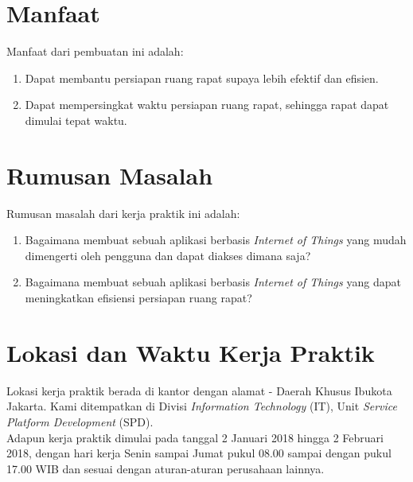 \section{Manfaat}
\tab Manfaat dari pembuatan \sistemSpasi ini adalah:
\begin{enumerate}
	\item Dapat membantu persiapan ruang rapat supaya lebih efektif dan efisien.
	\item Dapat mempersingkat waktu persiapan ruang rapat, sehingga rapat dapat dimulai tepat waktu.
\end{enumerate}

\section{Rumusan Masalah}
\tab Rumusan masalah dari kerja praktik ini adalah:
\begin{enumerate}
	\item Bagaimana membuat sebuah aplikasi berbasis \textit{Internet of Things} yang mudah dimengerti oleh pengguna dan dapat diakses dimana saja?
	\item Bagaimana membuat sebuah aplikasi berbasis \textit{Internet of Things} yang dapat meningkatkan efisiensi persiapan ruang rapat?
\end{enumerate}

\section{Lokasi dan Waktu Kerja Praktik}
\tab Lokasi kerja praktik berada di kantor \perusahaan dengan alamat \alamatPerusahaan - Daerah Khusus Ibukota Jakarta. Kami ditempatkan di Divisi \textit{Information Technology} (IT), Unit \textit{Service Platform Development} (SPD).\\
\tab Adapun kerja praktik dimulai pada tanggal 2 Januari 2018 hingga 2 Februari 2018, dengan hari kerja Senin sampai Jumat pukul 08.00 sampai dengan pukul 17.00 WIB dan sesuai dengan aturan-aturan perusahaan lainnya.

